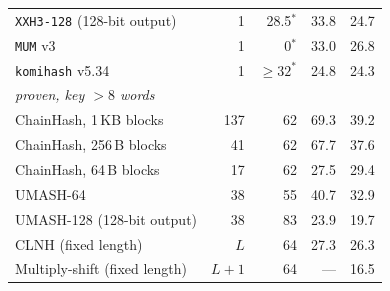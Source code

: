 \begin{table}[!htbp]
\begin{tabular}{lrrrr}
\texttt{XXH3-128} (128-bit output)          & 1 & 28.5$^*$ & 33.8 & 24.7 \\
\texttt{MUM} v3                             & 1 &  0$^*$   & 33.0 & 26.8 \\
\texttt{komihash} v5.34                     & 1 & $\ge32^*$ & 24.8 & 24.3 \\
\hline
\multicolumn{5}{l}{\emph{proven, key $> 8$ words}} \\
ChainHash, 1\,KB blocks                     & 137 & 62 & 69.3 & 39.2 \\
ChainHash, 256\,B blocks                    &  41 & 62 & 67.7 & 37.6 \\
ChainHash, 64\,B blocks                     &  17 & 62 & 27.5 & 29.4 \\
UMASH-64~\cite{umash}                       &  38 & 55 & 40.7 & 32.9 \\
UMASH-128 (128-bit output)                  &  38 & 83 & 23.9 & 19.7 \\
CLNH (fixed length)~\cite{lemire2015clhash} & $L$ & 64 & 27.3 & 26.3 \\
Multiply-shift (fixed length)               & $L{+}1$ & 64 & --- & 16.5 \\
\hline
\end{tabular}
\end{table}

